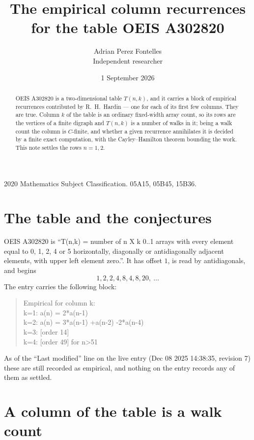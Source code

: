 \documentclass[11pt,a4paper]{article}
\title{The empirical column recurrences for the table OEIS A302820}
\author{Adrian Perez Fontelles\\ \small Independent researcher}
\date{1 September 2026}
\theoremstyle{plain}
\theoremstyle{definition}
\begin{document}
\maketitle

\begin{abstract}
OEIS A302820 is a two-dimensional table $T(n,k)$, and it carries a block of empirical
recurrences contributed by R.~H.~Hardin --- one for each of its first few columns. They are
true. Column $k$ of the table is an ordinary fixed-width array count, so its rows are the
vertices of a finite digraph and $T(n,k)$ is a number of walks in it; being a walk count the
column is $C$-finite, and whether a given recurrence annihilates it is decided by a finite
exact computation, with the Cayley--Hamilton theorem bounding the work. This note settles the rows $n=1, 2$.
\end{abstract}

\noindent\small 2020 Mathematics Subject Classification. 05A15, 05B45, 15B36.\normalsize

\section{The table and the conjectures}

OEIS A302820 is ``T(n,k) = number of n X k 0..1 arrays with every element equal to 0, 1, 2, 4 or 5 horizontally, diagonally or antidiagonally adjacent elements, with upper left element zero.''. It has offset $1$, is
read by antidiagonals, and begins
\[
1, 2, 2, 4, 8, 4, 8, 20,\ \dots
\]
The entry carries the following block:
\begin{quote}\small
Empirical for column k:\\
k=1: a(n) = 2*a(n-1)\\
k=2: a(n) = 3*a(n-1) +a(n-2) -2*a(n-4)\\
k=3: [order 14]\\
k=4: [order 49] for n>51\\
\end{quote}
As of the ``Last modified'' line on the live entry (Dec 08 2025 14:38:35, revision 7) these are still
recorded as empirical, and nothing on the entry records any of them as settled.

\section{A column of the table is a walk count}
\end{document}
